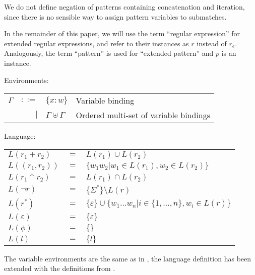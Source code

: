 We do not define negation of patterns containing concatenation and iteration,
since there is no sensible way to assign pattern variables to submatches.

In the remainder of this paper, we will use the term ``regular expression''
for extended regular expressions, and refer to their instances as $r$ instead
of $r_e$.  Analogously, the term ``pattern'' is used for ``extended pattern''
and $p$ is an instance.

Environments:

\begin{tabular}{lrll}
   $\Gamma$	& $::=$	& $\{x:w\}$			& Variable binding	\\
		& $|$	& $\Gamma \uplus \Gamma$	& Ordered multi-set of
							  variable bindings	\\
\end{tabular}

Language:

\begin{tabular}{lll}
   $L(r_1 + r_2)$	& $=$	& $L(r_1) \cup L(r_2)$					\\
   $L((r_1, r_2))$	& $=$	& $\{ w_1w_2 | w_1 \in L(r_1), w_2 \in L(r_2) \}$	\\
   $L(r_1 \cap r_2)$	& $=$	& $L(r_1) \cap L(r_2)$					\\
   $L(\neg r)$		& $=$	& $\{\Sigma^*\} \setminus L(r)$				\\
   $L(r^*)$		& $=$	&
      $\{\varepsilon\} \cup \{ w_1 \dots w_n | i
      \in \{ 1, \dots, n \}, w_i \in L(r) \}$	\\
   $L(\varepsilon)$	& $=$	& $\{\varepsilon\}$					\\
   $L(\phi)$		& $=$	& $\{\}$						\\
   $L(l)$		& $=$	& $\{l\}$						\\
\end{tabular}

The variable environments are the same as in \cite{pd-pat}, the language
definition has been extended with the definitions from \cite{pd-ere}.


